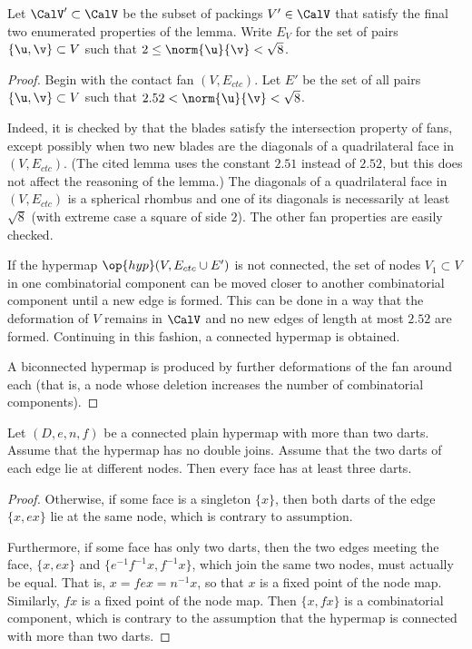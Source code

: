 \begin{definition}[$\CalV'$,~$E_V$]
%
%
Let $\CalV'\subset\CalV$ be the subset of packings $V'\in\CalV$ that
satisfy the final two enumerated properties of the lemma.  Write
$E_V$ for the set of pairs $\{\u,\v\}\subset V$
  such that $2\le\norm{\u}{\v} <\sqrt8$.
\end{definition}

\begin{proof}
  Begin with the contact fan $(V,E_{ctc})$.  Let $E'$ be the set
  of all pairs $\{\u,\v\}\subset V$ such that
  $2.52<\norm{\u}{\v}<\sqrt8$.

   Indeed, it is checked by
  \cite[Lemma~4.30]{Hales:2006:DCG} that the blades satisfy the
  intersection property of fans, except possibly when two new blades
  are the diagonals of a quadrilateral face in $(V,E_{ctc})$.  (The
  cited lemma uses the constant $2.51$ instead of $2.52$, but this
  does not affect the reasoning of the lemma.)  The diagonals of a quadrilateral face
  in $(V,E_{ctc})$ is a spherical rhombus and one of its diagonals is
  necessarily at least $\sqrt8$ (with extreme case a square of side
  $2$).  The other fan properties are easily checked.

  If the hypermap $\op{hyp}(V,E_{ctc}\cup E')$ is not connected,
  the set of nodes $V_1\subset V$ in one combinatorial component can
  be moved closer to another combinatorial component until a new edge
  is formed.  This can be done in a way that the deformation of $V$
  remains in $\CalV$ and no new edges of length at most $2.52$ are formed.
  Continuing in this fashion, a connected hypermap is obtained.

A biconnected hypermap is produced by  further
 deformations of the fan around each   (that is, a node 
whose deletion increases the number of combinatorial components).
\end{proof}


\begin{lemma}\label{lemma:dj}
Let $(D,e,n,f)$ be a connected plain hypermap with more than
two darts.  Assume that the hypermap has no  double joins. Assume that the
two darts of each edge lie at different nodes.
Then
every face has at least three darts.
\end{lemma}

\begin{proof}
Otherwise, if some face is a singleton $\{x\}$, then both darts
of the edge $\{x,e x\}$ lie at the same node, which is contrary to
assumption.

  Furthermore, if some face has only two darts, then 
 the two edges meeting the face, $\{x, e x\}$
  and $\{ e^{-1} f^{-1} x, f^{-1} x\}$, which join the same two nodes,
 must actually be equal.  That
  is, $ x = f e x = n^{-1} x$, so that $x$ is a fixed point of the node
  map.  Similarly, $f x$ is a fixed point of the node map.  Then $\{x,
  f x\}$ is a combinatorial component, which is contrary to the
  assumption that the hypermap is connected with more than two darts.
\end{proof}


